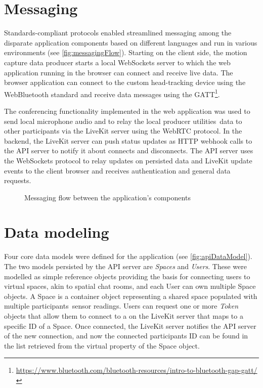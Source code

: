 \section{Messaging}
\label{sec:messaging}

Standards-compliant protocols enabled streamlined messaging among the disparate application components based on different languages and run in various environments (see \autoref{fig:messagingFlow}).
Starting on the client side, the motion capture data producer starts a local WebSockets server to which the web application running in the browser can connect and receive live data.
The browser application can connect to the custom head-tracking device using the WebBluetooth standard and receive data messages using the \ac{GATT}\footnote{\url{https://www.bluetooth.com/bluetooth-resources/intro-to-bluetooth-gap-gatt/}}.

The conferencing functionality implemented in the web application was used to send local microphone audio and to relay the local producer utilities\textquotesingle\ data to other participants via the LiveKit server using the WebRTC protocol.
In the backend, the LiveKit server can push status updates as \ac{HTTP} webhook calls to the \ac{API} server to notify it about connects and disconnects.
The \ac{API} server uses the WebSockets protocol to relay updates on persisted data and LiveKit update events to the client browser and receives authentication and general data requests.

\begin{figure}[!ht]
\centering

\caption[Application messaging flow]{Messaging flow between the application's components\protect}
\label{fig:messagingFlow}
\end{figure}

\section{Data modeling}
\label{sec:datamodeling}

Four core data models were defined for the application (see \autoref{fig:apiDataModel}).
The two models persisted by the \ac{API} server are \emph{Spaces} and \emph{Users}.
These were modelled as simple reference objects providing the basis for connecting users to virtual spaces, akin to spatial chat rooms, and each User can own multiple Space objects.
A Space is a container object representing a shared space populated with multiple participants\textquotesingle\ sensor readings.
Users can request one or more \emph{Token} objects that allow them to connect to a  on the LiveKit server that maps to a specific ID of a Space.
Once connected, the LiveKit server notifies the \ac{API} server of the new connection, and now the connected participant\textquotesingle s ID can be found in the list retrieved from the virtual  property of the Space object.

